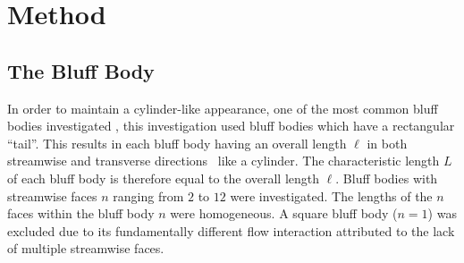 \section{Method}
\subsection{The Bluff Body}
\label{sec:bluffBody}
In order to maintain a cylinder-like appearance, one of the most common bluff bodies investigated \parencite[475]{rocchi2002_vortex}, this investigation used bluff bodies which have a rectangular “tail”. This results in each bluff body having an overall length $\ell$ in both streamwise and transverse directions \textemdash\ like a cylinder. The characteristic length $L$ of each bluff body is therefore equal to the overall length $\ell$. Bluff bodies with streamwise faces $n$ ranging from $2$ to $12$ were investigated. The lengths of the $n$ faces within the bluff body $n$ were homogeneous. A square bluff body ($n=1$) was excluded due to its fundamentally different flow interaction attributed to the lack of multiple streamwise faces. 

